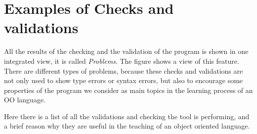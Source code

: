 \newpage
\appendix



\section{Examples of Checks and validations}

All the results of the checking and the validation of the program is shown in one integrated view, it is called \emph{Problems}. The figure  shows a view of this feature. 
There are different types of problems, because these checks and validations are not only used to show type errors or syntax errors, but also to encourage some properties of the program we consider as main topics in the learning process of an OO language.

Here there is a list of all the validations and checking the tool is performing, and a brief reason why they are useful in the teaching of an object oriented language.

